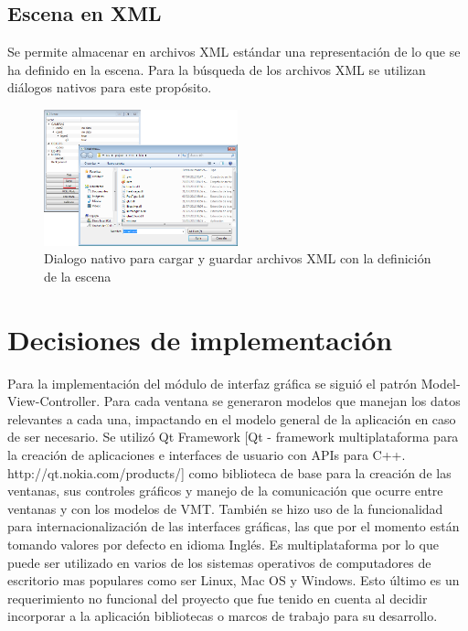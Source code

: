 \subsection{Escena en XML}
Se permite almacenar en archivos XML estándar una representación de lo que se ha definido en la escena. Para la búsqueda de los archivos XML se utilizan diálogos nativos para este propósito.

\begin{figure}[H]
  \centering
    \includegraphics[width=0.5\textwidth]{./Cap5_vmt/vmt_loadShow.png}
  \caption{Dialogo nativo para cargar y guardar archivos XML con la definición de la escena}
  \label{fig:VMT-XML}
\end{figure}

\section{Decisiones de implementación}
Para la implementación del módulo de interfaz gráfica se siguió el patrón Model-View-Controller. Para cada ventana se generaron modelos que manejan los datos relevantes a cada una, impactando en el modelo general de la aplicación en caso de ser necesario.
Se utilizó Qt Framework [Qt - framework multiplataforma para la creación de aplicaciones e interfaces de usuario con APIs para C++. http://qt.nokia.com/products/] como biblioteca de base para la creación de las ventanas, sus controles gráficos y manejo de la comunicación que ocurre entre ventanas y con los modelos de VMT. También se hizo uso de la funcionalidad para internacionalización de las interfaces gráficas, las que por el momento están tomando valores por defecto en idioma Inglés. Es multiplataforma por lo que puede ser utilizado en varios de los sistemas operativos de computadores de escritorio mas populares como ser Linux, Mac OS y Windows. Esto último es un requerimiento no funcional del proyecto que fue tenido en cuenta al decidir incorporar a la aplicación bibliotecas o marcos de trabajo para su desarrollo.
